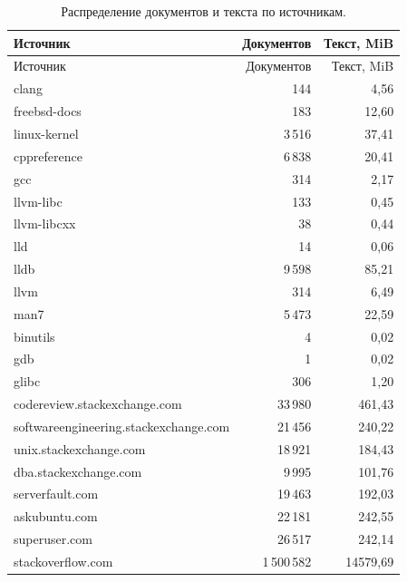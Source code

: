 \begin{longtable}{lrr}
\caption{Распределение документов и текста по источникам.}\\
\toprule Источник & Документов & Текст, MiB\\\midrule\endfirsthead
\toprule Источник & Документов & Текст, MiB\\\midrule\endhead
clang & 144 & 4,56\\
freebsd-docs & 183 & 12,60\\
linux-kernel & 3\,516 & 37,41\\
cppreference & 6\,838 & 20,41\\
gcc & 314 & 2,17\\
llvm-libc & 133 & 0,45\\
llvm-libcxx & 38 & 0,44\\
lld & 14 & 0,06\\
lldb & 9\,598 & 85,21\\
llvm & 314 & 6,49\\
man7 & 5\,473 & 22,59\\
binutils & 4 & 0,02\\
gdb & 1 & 0,02\\
glibc & 306 & 1,20\\
codereview.stackexchange.com & 33\,980 & 461,43\\
softwareengineering.stackexchange.com & 21\,456 & 240,22\\
unix.stackexchange.com & 18\,921 & 184,43\\
dba.stackexchange.com & 9\,995 & 101,76\\
serverfault.com & 19\,463 & 192,03\\
askubuntu.com & 22\,181 & 242,55\\
superuser.com & 26\,517 & 242,14\\
stackoverflow.com & 1\,500\,582 & 14579,69\\
\bottomrule
\end{longtable}
